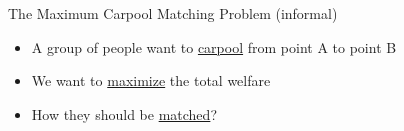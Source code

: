\begin{frame}{The Maximum Carpool Matching Problem (informal)}
\begin{itemize}[<+>]
	\item A group of people want to \underline{carpool} from point A to point B
	\item We want to \underline{maximize} the total welfare
	\item How they should be \underline{matched}?
\end{itemize}

\centering


\end{frame}